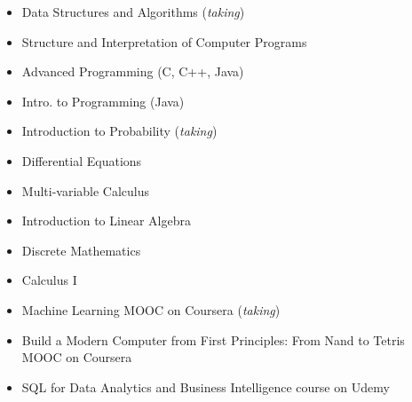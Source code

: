 \documentclass[10pt,a4paper,ragged2e]{altacv}
\begin{document}
\begin{itemize}
    \item Data Structures and Algorithms (\textit{taking})
    \item Structure and Interpretation of Computer Programs
    \item Advanced Programming (C, C++, Java)
    \item Intro. to Programming (Java)
\end{itemize}
\begin{itemize}
    \item Introduction to Probability (\textit{taking})
    \item Differential Equations
    \item Multi-variable Calculus
    \item Introduction to Linear Algebra
    \item Discrete Mathematics
    \item Calculus I
\end{itemize}
\begin{itemize}
    \item Machine Learning MOOC on Coursera (\textit{taking})
    \item Build a Modern Computer from First Principles: From Nand to Tetris MOOC on Coursera
    \item SQL for Data Analytics and Business Intelligence course on Udemy
\end{itemize}
\smallskip

\clearpage

\nocite{*}
\end{document}
